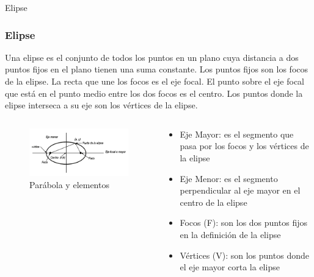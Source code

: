 \documentclass[xcolor={dvipsnames},aspectratio=169,10pt]{beamer}
\begin{document}
\begin{frame}{Elipse}
  \frametitle{Elipse}
    Una elipse es el conjunto de todos los puntos en un plano cuya distancia a dos puntos fijos en el plano tienen una suma constante. 
    Los puntos fijos son los focos de la elipse. La recta que une los focos es el eje focal. El punto sobre el eje focal que está en el 
    punto medio entre los dos focos es el centro. Los puntos donde la elipse interseca a su eje son los vértices de la elipse.
  \begin{columns}
    \begin{column}{0.5\textwidth}
      \begin{figure}
        \includegraphics[width=\textwidth, height=0.6\textheight, keepaspectratio]{images/eli1.png}
        \caption{Parábola y elementos}
      \end{figure}
    \end{column}
    \begin{column}{0.5\textwidth}
      \begin{itemize}
        \item Eje Mayor: es el segmento que pasa por los focos y los vértices de la elipse
        \item Eje Menor: es el segmento perpendicular al eje mayor en el centro de la elipse
        \item Focos (F): son los dos puntos fijos en la definición de la elipse
        \item Vértices (V): son los puntos donde el eje mayor corta la elipse
      \end{itemize}
    \end{column}
  \end{columns}
\end{frame}
\end{document}
